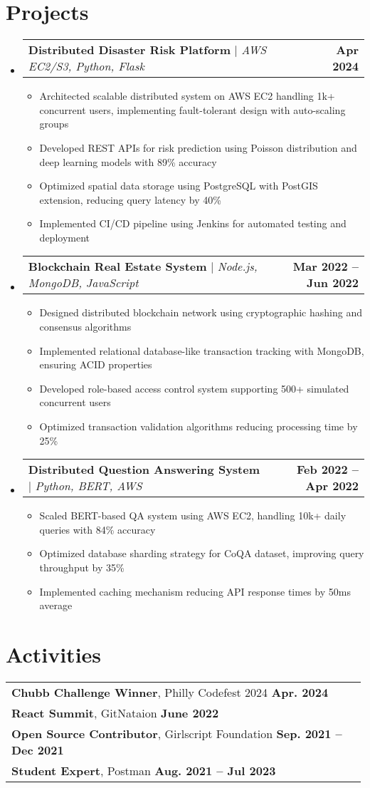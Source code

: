 \documentclass[letterpaper,11pt]{article}
\makeatletter
\newcommand{\resumeItem}[1]{
  \item\small{
    {#1 \vspace{-2pt}}
  }
}
\newcommand{\resumeProjectHeading}[2]{
    \item
    \begin{tabular*}{1.001\textwidth}{l@{\extracolsep{\fill}}r}
      \small#1 & \textbf{\small #2}\\
    \end{tabular*}\vspace{-3pt}
}
\newcommand{\resumeSubHeadingListStart}{\begin{itemize}[leftmargin=0.0in, label={}]}
\newcommand{\resumeSubHeadingListEnd}{\end{itemize}}
\newcommand{\resumeItemListStart}{\begin{itemize}}
\newcommand{\resumeItemListEnd}{\end{itemize}\vspace{-5pt}}
\makeatother
\begin{document}
\section{Projects}
\vspace{-5pt}
\resumeSubHeadingListStart
    \resumeProjectHeading
    {\textbf{Distributed Disaster Risk Platform} $|$ \emph{AWS EC2/S3, Python, Flask}} {Apr 2024}
    \resumeItemListStart
        \resumeItem{Architected scalable distributed system on AWS EC2 handling 1k+ concurrent users, implementing fault-tolerant design with auto-scaling groups}
        \resumeItem{Developed REST APIs for risk prediction using Poisson distribution and deep learning models with 89\% accuracy}
        \resumeItem{Optimized spatial data storage using PostgreSQL with PostGIS extension, reducing query latency by 40\%}
        \resumeItem{Implemented CI/CD pipeline using Jenkins for automated testing and deployment}
    \resumeItemListEnd
    \resumeProjectHeading
    {\textbf{Blockchain Real Estate System} $|$ \emph{Node.js, MongoDB, JavaScript}} {Mar 2022 -- Jun 2022}
    \resumeItemListStart
        \resumeItem{Designed distributed blockchain network using cryptographic hashing and consensus algorithms}
        \resumeItem{Implemented relational database-like transaction tracking with MongoDB, ensuring ACID properties}
        \resumeItem{Developed role-based access control system supporting 500+ simulated concurrent users}
        \resumeItem{Optimized transaction validation algorithms reducing processing time by 25\%}
    \resumeItemListEnd
    \resumeProjectHeading
    {\textbf{Distributed Question Answering System} $|$ \emph{Python, BERT, AWS}} {Feb 2022 -- Apr 2022}
    \resumeItemListStart
        \resumeItem{Scaled BERT-based QA system using AWS EC2, handling 10k+ daily queries with 84\% accuracy}
        \resumeItem{Optimized database sharding strategy for CoQA dataset, improving query throughput by 35\%}
        \resumeItem{Implemented caching mechanism reducing API response times by 50ms average}
    \resumeItemListEnd
\resumeSubHeadingListEnd

\section{Activities}
\begin{tabular}{p{0.99\linewidth}}
    \hspace{0.15in}\textbf{Chubb Challenge Winner}, Philly Codefest 2024
        \hfill \textbf{Apr. 2024} \\
            \hspace{0.15in}\textbf{React Summit}, GitNataion
        \hfill \textbf{June 2022}\\
    \hspace{0.15in}\textbf{Open Source Contributor}, Girlscript Foundation
        \hfill \textbf{Sep. 2021 -- Dec 2021}\\

    \hspace{0.15in}\textbf{Student Expert}, Postman
        \hfill \textbf{Aug. 2021 -- Jul 2023} 
    
\end{tabular}
\vspace{-15pt}
\end{document}

